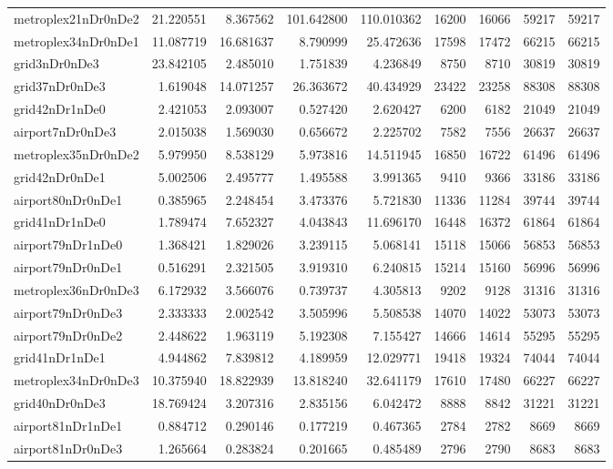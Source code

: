 \begin{longtable}{|l|r|r|r|r|r|r|r|r|}
metroplex21nDr0nDe2 & 21.220551 & 8.367562 & 101.642800 & 110.010362 & 16200 & 16066 & 59217 & 59217 \\
metroplex34nDr0nDe1 & 11.087719 & 16.681637 & 8.790999 & 25.472636 & 17598 & 17472 & 66215 & 66215 \\
grid3nDr0nDe3 & 23.842105 & 2.485010 & 1.751839 & 4.236849 & 8750 & 8710 & 30819 & 30819 \\
grid37nDr0nDe3 & 1.619048 & 14.071257 & 26.363672 & 40.434929 & 23422 & 23258 & 88308 & 88308 \\
grid42nDr1nDe0 & 2.421053 & 2.093007 & 0.527420 & 2.620427 & 6200 & 6182 & 21049 & 21049 \\
airport7nDr0nDe3 & 2.015038 & 1.569030 & 0.656672 & 2.225702 & 7582 & 7556 & 26637 & 26637 \\
metroplex35nDr0nDe2 & 5.979950 & 8.538129 & 5.973816 & 14.511945 & 16850 & 16722 & 61496 & 61496 \\
grid42nDr0nDe1 & 5.002506 & 2.495777 & 1.495588 & 3.991365 & 9410 & 9366 & 33186 & 33186 \\
airport80nDr0nDe1 & 0.385965 & 2.248454 & 3.473376 & 5.721830 & 11336 & 11284 & 39744 & 39744 \\
grid41nDr1nDe0 & 1.789474 & 7.652327 & 4.043843 & 11.696170 & 16448 & 16372 & 61864 & 61864 \\
airport79nDr1nDe0 & 1.368421 & 1.829026 & 3.239115 & 5.068141 & 15118 & 15066 & 56853 & 56853 \\
airport79nDr0nDe1 & 0.516291 & 2.321505 & 3.919310 & 6.240815 & 15214 & 15160 & 56996 & 56996 \\
metroplex36nDr0nDe3 & 6.172932 & 3.566076 & 0.739737 & 4.305813 & 9202 & 9128 & 31316 & 31316 \\
airport79nDr0nDe3 & 2.333333 & 2.002542 & 3.505996 & 5.508538 & 14070 & 14022 & 53073 & 53073 \\
airport79nDr0nDe2 & 2.448622 & 1.963119 & 5.192308 & 7.155427 & 14666 & 14614 & 55295 & 55295 \\
grid41nDr1nDe1 & 4.944862 & 7.839812 & 4.189959 & 12.029771 & 19418 & 19324 & 74044 & 74044 \\
metroplex34nDr0nDe3 & 10.375940 & 18.822939 & 13.818240 & 32.641179 & 17610 & 17480 & 66227 & 66227 \\
grid40nDr0nDe3 & 18.769424 & 3.207316 & 2.835156 & 6.042472 & 8888 & 8842 & 31221 & 31221 \\
airport81nDr1nDe1 & 0.884712 & 0.290146 & 0.177219 & 0.467365 & 2784 & 2782 & 8669 & 8669 \\
airport81nDr0nDe3 & 1.265664 & 0.283824 & 0.201665 & 0.485489 & 2796 & 2790 & 8683 & 8683 \\

\end{longtable}
